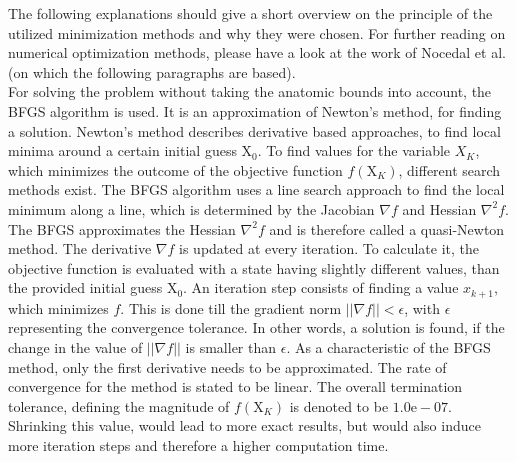 The following explanations should give a short overview on the principle of the utilized minimization methods and why they were chosen. For further reading on numerical optimization methods, please have a look at the work of Nocedal et al. \cite{nocedal2006numerical} (on which the following paragraphs are based).\\
For solving the problem without taking the anatomic bounds into account, the \ac{BFGS} algorithm is used. It is an approximation of Newton's method, for finding a solution. Newton's method describes derivative based approaches, to find local minima around a certain initial guess $ \mathrm{X}_{0} $. To find values for the variable $ X_{K} $, which minimizes the outcome of the objective function $ f(\mathrm{X}_K) $, different search methods exist. The \ac{BFGS} algorithm uses a line search approach to find the local minimum along a line, which is determined by the Jacobian $ \nabla f $ and Hessian $ \nabla^{2} f $. The \ac{BFGS} approximates the Hessian  $ \nabla^{2} f $ and is therefore called a quasi-Newton method. The derivative $ \nabla f $ is updated at every iteration. To calculate it, the objective function is evaluated with a state having slightly different values, than the provided initial guess $ \mathrm{X}_{0} $. An iteration step consists of finding a value $ x_{k+1} $, which minimizes $ f $. This is done till the gradient norm $ || \nabla f|| < \epsilon$, with $ \epsilon $ representing the convergence tolerance. In other words, a solution is found, if the change in the value of $ ||\nabla f|| $ is smaller than $ \epsilon $. As a characteristic of the \ac{BFGS} method, only the first derivative needs to be approximated. The rate of convergence for the method is stated to be linear. The overall termination tolerance, defining the magnitude of $ f(\mathrm{X}_K) $ is denoted to be $ 1.0\text{e}-07 $. Shrinking this value, would lead to more exact results, but would also induce more iteration steps and therefore a higher computation time.\\
